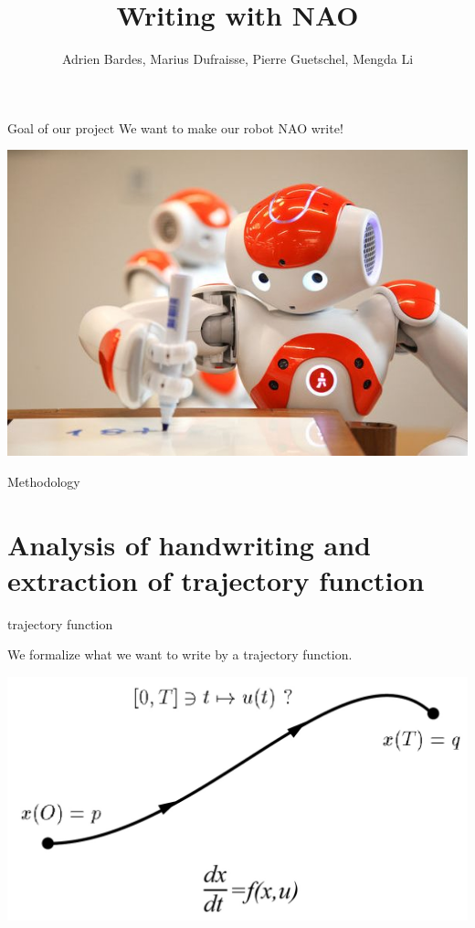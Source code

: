 \documentclass{beamer}
\title{Writing with NAO}
\author{Adrien Bardes, Marius Dufraisse, Pierre Guetschel, Mengda Li}
\begin{document}
\frame{\titlepage}

\begin{frame}{Goal of our project}
We want to make our robot NAO write!
\medskip

\includegraphics[scale = 0.7]{NAO_writes.jpg}\cite{1}
\end{frame}

\begin{frame}{Methodology}
\tableofcontents
\end{frame}

\section{Analysis of handwriting and extraction of trajectory function}
\begin{frame}{trajectory function}

We formalize what we want to write by a trajectory function.
\bigskip

\includegraphics[scale = 0.3]{planning.jpg}\cite{2}
\end{frame}
\end{document}
